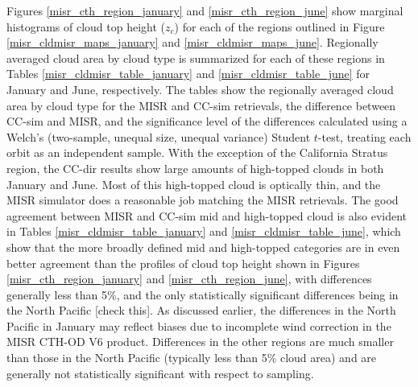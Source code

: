 Figures \ref{misr_cth_region_january} and \ref{misr_cth_region_june} show marginal histograms of cloud top height ($z_c$) for each of the regions outlined in Figure \ref{misr_cldmisr_maps_january} and \ref{misr_cldmisr_maps_june}. Regionally averaged cloud area by cloud type is summarized for each of these regions in Tables \ref{misr_cldmisr_table_january} and \ref{misr_cldmisr_table_june} for January and June, respectively. The tables show the regionally averaged cloud area by cloud type for the MISR and CC-sim retrievals, the difference between CC-sim and MISR, and the significance level of the differences calculated using a Welch's (two-sample, unequal size, unequal variance) Student $t$-test, treating each orbit as an independent sample. With the exception of the California Stratus region, the CC-dir results show large amounts of high-topped clouds in both January and June. Most of this high-topped cloud is optically thin, and the MISR simulator does a reasonable job matching the MISR retrievals. The good agreement between MISR and CC-sim mid and high-topped cloud is also evident in Tables \ref{misr_cldmisr_table_january} and \ref{misr_cldmisr_table_june}, which show that the more broadly defined mid and high-topped categories are in even better agreement than the profiles of cloud top height shown in Figures \ref{misr_cth_region_january} and \ref{misr_cth_region_june}, with differences generally less than 5\%, and the only statistically significant differences being in the North Pacific [check this]. As discussed earlier, the differences in the North Pacific in January may reflect biases due to incomplete wind correction in the MISR CTH-OD V6 product. Differences in the other regions are much smaller than those in the North Pacific (typically less than 5\% cloud area) and are generally not statistically significant with respect to sampling.

